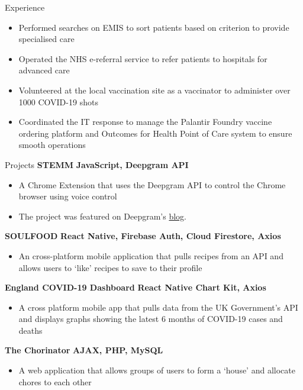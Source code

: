 \documentclass{resume}
\begin{document}
\begin{rSection}{Experience}
\begin{itemize}[nolistsep]
            \item Performed searches on EMIS to sort patients based on criterion to provide specialised care
            \item Operated the NHS e-referral service to refer patients to hospitals for advanced care
            \item Volunteered at the local vaccination site as a vaccinator to administer over 1000 COVID-19 shots
            \item Coordinated the IT response to manage the Palantir Foundry vaccine ordering platform and Outcomes for Health Point of Care system to ensure smooth operations
        \end{itemize}  
    \end{rSection}

    \begin{rSection}{Projects}
        {\bf STEMM} \hfill {\bf JavaScript, Deepgram API}
        \begin{itemize}[nolistsep]
            \item A Chrome Extension that uses the Deepgram API to control the Chrome browser using voice control
            \item The project was featured on Deepgram's \href{https://developers.deepgram.com/blog/2022/03/voice-control-browser-stemm/}{blog}. 
        \end{itemize}

        {\bf SOULFOOD} \hfill {\bf React Native, Firebase Auth, Cloud Firestore, Axios}
        \begin{itemize}[nolistsep]
            \item An cross-platform mobile application that pulls recipes from an API and allows users to `like' recipes to save to their profile
        \end{itemize}

        {\bf England COVID-19 Dashboard} \hfill {\bf React Native Chart Kit, Axios}
        \begin{itemize}[nolistsep]
            \item A cross platform mobile app that pulls data from the UK Government's API and displays graphs showing the latest 6 months of COVID-19 cases and deaths
        \end{itemize}
        {\bf The Chorinator} \hfill {\bf AJAX, PHP, MySQL}
        \begin{itemize}[nolistsep]
            \item A web application that allows groups of users to form a `house' and allocate chores to each other
        \end{itemize}
    \end{rSection}
\end{document}
